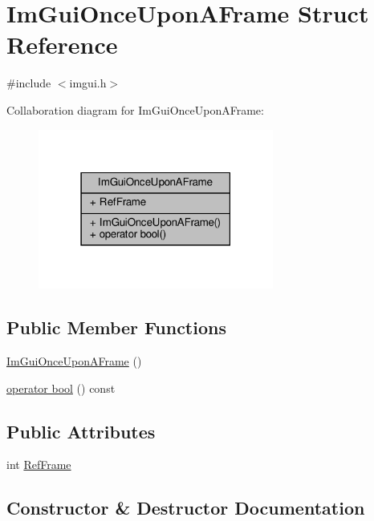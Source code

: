 \hypertarget{structImGuiOnceUponAFrame}{}\section{Im\+Gui\+Once\+Upon\+A\+Frame Struct Reference}
\label{structImGuiOnceUponAFrame}


{\ttfamily \#include $<$imgui.\+h$>$}



Collaboration diagram for Im\+Gui\+Once\+Upon\+A\+Frame\+:
\nopagebreak
\begin{figure}[H]
\begin{center}
\leavevmode
\includegraphics[width=219pt]{structImGuiOnceUponAFrame__coll__graph}
\end{center}
\end{figure}
\subsection*{Public Member Functions}
\begin{DoxyCompactItemize}
\item 
\hyperlink{structImGuiOnceUponAFrame_ac9513f72a884f6fe844869b157b23f1f}{Im\+Gui\+Once\+Upon\+A\+Frame} ()
\item 
\hyperlink{structImGuiOnceUponAFrame_a3c912b79bc333ce746356001431c2504}{operator bool} () const
\end{DoxyCompactItemize}
\subsection*{Public Attributes}
\begin{DoxyCompactItemize}
\item 
int \hyperlink{structImGuiOnceUponAFrame_a2d44776b8e7bdeec217f88be9f832e08}{Ref\+Frame}
\end{DoxyCompactItemize}


\subsection{Constructor \& Destructor Documentation}
\mbox{\label{structImGuiOnceUponAFrame_ac9513f72a884f6fe844869b157b23f1f}} 
